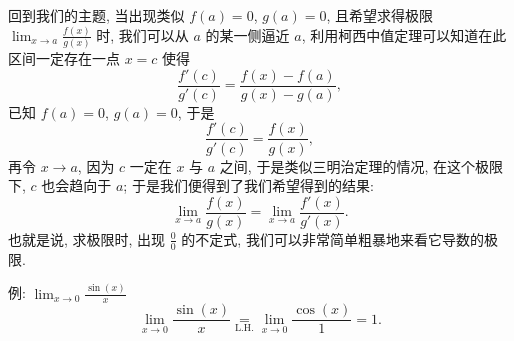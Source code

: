 回到我们的主题, 当出现类似 $f(a)=0$, $g(a)=0$, 且希望求得极限
$\lim_{x\rightarrow a}\frac{f(x)}{g(x)}$ 时, 我们可以从 $a$
的某一侧逼近 $a$, 利用柯西中值定理可以知道在此区间一定存在一点 $x=c$
使得 \[
\frac{f'(c)}{g'(c)}=\frac{f(x)-f(a)}{g(x)-g(a)},
\] 已知 $f(a)=0$, $g(a)=0$, 于是 \[
\frac{f'(c)}{g'(c)}=\frac{f(x)}{g(x)},
\] 再令 $x\rightarrow a$, 因为 $c$ 一定在 $x$ 与 $a$ 之间,
于是类似三明治定理的情况, 在这个极限下, $c$ 也会趋向于 $a$;
于是我们便得到了我们希望得到的结果: \[
\boxed{\lim_{x\rightarrow a}\frac{f(x)}{g(x)}=\lim_{x\rightarrow a}\frac{f'(x)}{g'(x)}}.
\] 也就是说, 求极限时, 出现 $\frac{0}{0}$ 的不定式,
我们可以非常简单粗暴地来看它导数的极限.

\begin{newquote}
例: $\lim_{x\rightarrow 0}\frac{\sin(x)}{x}$ \[
\lim_{x\rightarrow 0}\frac{\sin(x)}{x}\underset{\text{L.H.}}{=}\lim_{x\rightarrow 0}\frac{\cos(x)}{1}=1.
\]
\end{newquote}